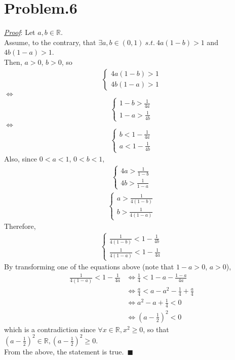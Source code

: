 \documentclass[12pt]{article}
\begin{document}
\section*{Problem.6}
\underline{\textit{Proof}}: Let $a, b \in \mathbb{R}$.\\[1em]
Assume, to the contrary, that $\exists a, b \in (0,1) ~s.t.~ 4a(1-b) > 1$ and $4b(1-a) > 1$.\\[1em]
Then, $a > 0$, $b > 0$, so
\begin{gather*}
\left\{
\begin{array}{l}
    4a(1 - b) > 1 \\[1em]
    4b(1 - a) > 1
\end{array}
\right.
\end{gather*}
$\Leftrightarrow$
\begin{gather*}
\left\{
\begin{array}{l}
    1 - b > \frac{1}{4a} \\[1em]
    1 - a > \frac{1}{4b}
\end{array}
\right.
\end{gather*}
$\Leftrightarrow$
\begin{gather*}
\left\{
\begin{array}{l}
    b < 1 - \frac{1}{4a}\\[1em]
    a < 1 - \frac{1}{4b}
\end{array}
\right.
\end{gather*}
Also, since $0 < a < 1$, $0 < b < 1$,
\begin{gather*}
\left\{
\begin{array}{l}
    4a > \frac{1}{1-b} \\[1em]
    4b > \frac{1}{1-a}
\end{array}
\right.
\end{gather*}
\begin{gather*}
\left\{
\begin{array}{l}
    a > \frac{1}{4(1-b)} \\[1em]
    b > \frac{1}{4(1-a)}
\end{array}
\right.
\end{gather*}
Therefore,
\begin{gather*}
\left\{
\begin{array}{l}
    \frac{1}{4(1-b)} < 1 - \frac{1}{4b} \\[1em]
    \frac{1}{4(1-a)} < 1 - \frac{1}{4a}
\end{array}
\right.
\end{gather*}
By transforming one of the equations above (note that $1 - a > 0$, $a > 0$),
\begin{align*}
\frac{1}{4(1-a)} < 1 - \frac{1}{4a} &\Leftrightarrow \frac{1}{4} < 1 - a - \frac{1-a}{4a}\\[1em]
&\Leftrightarrow \frac{a}{4} < a - a^2 - \frac{1}{4} + \frac{a}{4}\\[1em]
&\Leftrightarrow a^2 - a + \frac{1}{4} < 0\\[1em]
&\Leftrightarrow \left(a - \frac{1}{2}\right)^2 < 0
\end{align*}
which is a contradiction since $\forall x \in \mathbb{R}, x^2 \geq 0$, so that $\left(a - \frac{1}{2}\right)^2 \in \mathbb{R}, \left(a - \frac{1}{2}\right)^2 \geq 0$.\\[1em]
From the above, the statement is true.~$\blacksquare$
\end{document}

